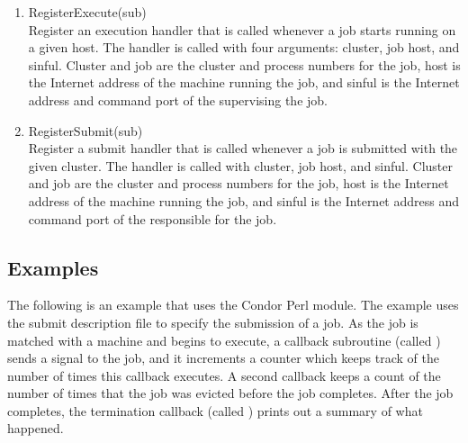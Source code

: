 \begin{enumerate}
	\item RegisterExecute(sub) \\
	Register an execution handler that is called whenever a job starts
	running on a given host.  The handler is called with four arguments:
	cluster, job  host, and sinful.  Cluster and job are the cluster and
	process numbers for the job, host is the Internet address of the
	machine running the job, and sinful is the Internet address and 
	command port of the  supervising the job.

	\item RegisterSubmit(sub) \\
	Register a submit handler that is called whenever a job is submitted
	with the given cluster.  The handler is called with cluster, job 
	host, and sinful. Cluster and job are the cluster and
	process numbers for the job, host is the Internet address of the
	machine running the job, and sinful is the Internet address and
	command port of the  responsible for the job.

\end{enumerate}

\subsection{Examples}

The following is an example that uses the Condor Perl module.
The example uses the submit description file 
 to specify the submission of a job.
As the job is matched with a machine and begins to execute,
a callback  subroutine (called \verb@execute@)
sends a  signal to the job,
and it increments a counter which keeps track of the
number of times this callback executes.
A second callback keeps a count of the number of times
that the job was evicted before the job completes.
After the job completes, the termination
callback (called \verb@normal@) prints out a summary of what happened.

